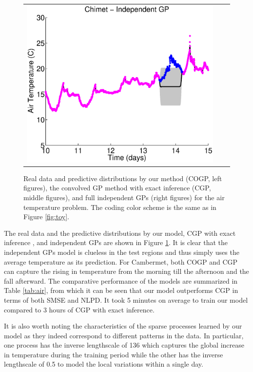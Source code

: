 \begin{figure}
\begin{tabular}{ccc}
\includegraphics[scale=0.3]{figures/weatherChimet.eps}
\end{tabular}
\caption{Real data and predictive distributions by our method (COGP, left figures), the convolved GP method with exact inference (CGP, middle figures), and full independent GPs (right figures) for the air temperature problem. The coding color scheme is the same as in Figure \ref{fig:toy}.}
\label{fig:weather}
\end{figure}

The real data and the predictive distributions by our model, CGP with exact inference \citep{alvarez-lawrence-nips-08}, and independent GPs are shown in Figure \ref{fig:weather}.
It is clear that the independent GPs model is clueless in the test regions and thus simply uses the average temperature as its prediction.
For Cambermet, both COGP and CGP can capture the rising in temperature from the morning till the afternoon and the fall afterward.
The comparative performance of the models are summarized in Table \ref{tab:air}, from which it can be seen that our model outperforms CGP in terms of both SMSE and NLPD.
It took 5 minutes on average to train our model compared to 3 hours of CGP with exact inference.

It is also worth noting the characteristics of the sparse processes learned by our model as they indeed correspond to different patterns in the data.
In particular, one process has the inverse lengthscale of 136 which captures the global increase in temperature during the training period while the other has the inverse lengthscale of 0.5 to model the local variations within a single day.

